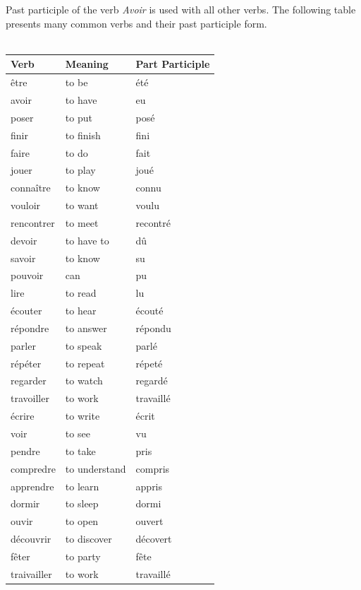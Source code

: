 \noindent Past participle of the verb \emph{Avoir} is used with all other verbs.
The following table presents many common verbs and their past participle form.\\\\

\begin{longtable}{| l | l | l |}
\hline
Verb            & Meaning             & Part Participle \\
\hline
\endhead
\^etre        & to be       & \'et\'e     \\ \hline
avoir         & to have     & eu          \\ \hline
poser         & to put      & pos\'e      \\ \hline
finir         & to finish   & fini        \\ \hline
faire         & to do       & fait        \\ \hline
jouer         & to play     & jou\'e      \\ \hline
conna\^itre   & to know     & connu       \\ \hline
vouloir       & to want     & voulu       \\ \hline
rencontrer    & to meet     & recontr\'e  \\ \hline
devoir        & to have to  & d\^u        \\ \hline
savoir        & to know     & su          \\ \hline
pouvoir       & can         & pu          \\ \hline
lire          & to read     & lu          \\ \hline
\'ecouter     & to hear     & \'ecout\'e  \\ \hline
r\'epondre    & to answer   & r\'epondu   \\ \hline
parler        & to speak    & parl\'e     \\ \hline
r\'ep\'eter   & to repeat   & r\'epet\'e  \\ \hline
regarder      & to watch    & regard\'e   \\ \hline
travoiller    & to work     & travaill\'e \\ \hline
\'ecrire      & to write    & \'ecrit     \\ \hline
voir          & to see      & vu          \\ \hline
pendre        & to take     & pris        \\ \hline
compredre     & to understand  & compris  \\ \hline
apprendre     & to learn    & appris      \\ \hline
dormir        & to sleep    & dormi       \\ \hline
ouvir         & to open     & ouvert      \\ \hline
d\'ecouvrir   & to discover & d\'ecovert  \\ \hline
f\^eter       & to party    & f\^ete      \\ \hline
traivailler   & to work     & travaill\'e \\ \hline
\end{longtable}

